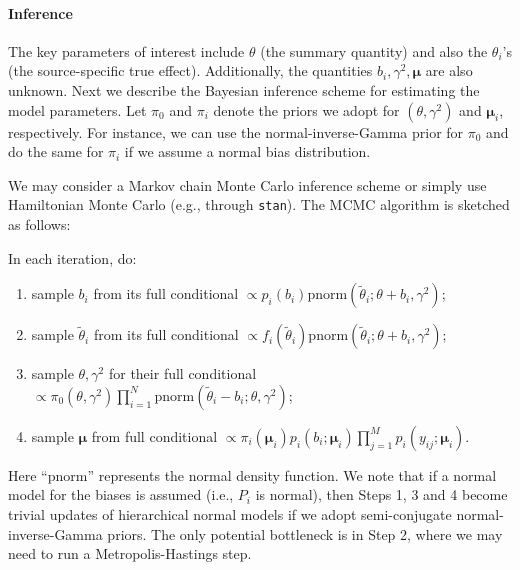\documentclass{article}
\begin{document}

\paragraph{Inference}
The key parameters of interest include $\theta$ (the summary quantity) and also the $\theta_i$'s (the source-specific true effect).
Additionally, the quantities $b_i, \gamma^2, \boldsymbol\mu$ are also unknown.
Next we describe the Bayesian inference scheme for estimating the model parameters.
Let $\pi_0$ and $\pi_i$ denote the priors we adopt for $(\theta,\gamma^2)$ and $\boldsymbol\mu_i$, respectively.
For instance, we can use the normal-inverse-Gamma prior for $\pi_0$ and do the same for $\pi_i$ if we assume a normal bias distribution.


We may consider a Markov chain Monte Carlo inference scheme or simply use Hamiltonian Monte Carlo (e.g., through \texttt{stan}). The MCMC algorithm is sketched as follows:

In each iteration, do:
\begin{enumerate}
    \item sample $b_i$ from its full conditional $\propto p_i(b_i)\text{pnorm}(\tilde\theta_i; \theta+b_i, \gamma^2)$;
    \item sample $\tilde\theta_i$ from its full conditional $\propto f_i(\tilde\theta_i)\text{pnorm}(\tilde\theta_i; \theta+b_i, \gamma^2)$;
    \item sample $\theta, \gamma^2$ for their full conditional $\propto \pi_0(\theta, \gamma^2) \prod_{i=1}^N \text{pnorm}(\tilde\theta_i-b_i; \theta, \gamma^2)$;
    \item sample $\boldsymbol\mu$ from full conditional $\propto \pi_i(\boldsymbol\mu_i) p_i(b_i; \boldsymbol\mu_i) \prod_{j=1}^M p_i(y_{ij}; \boldsymbol\mu_i)$.
\end{enumerate}
Here ``$\text{pnorm}$'' represents the normal density function.
We note that if a normal model for the biases is assumed (i.e., $P_i$ is normal),
then Steps 1, 3 and 4 become trivial updates of hierarchical normal models if we adopt semi-conjugate normal-inverse-Gamma priors.
The only potential bottleneck is in Step 2, where we may need to run a Metropolis-Hastings step.
\end{document}
